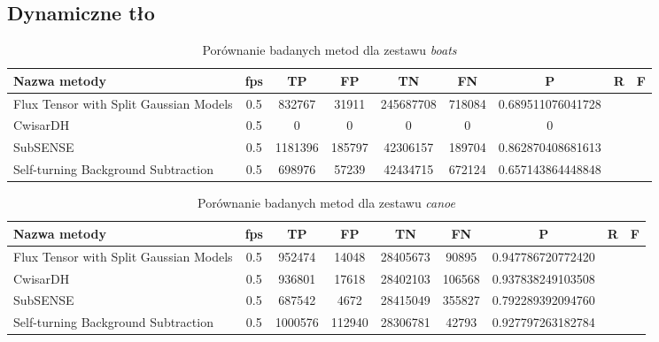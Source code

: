 \subsection{Dynamiczne tło}
\begin{table}[h]
\caption{Porównanie badanych metod dla zestawu \textit{boats}}
\label{tab:resultsBoats}
\centering
\begin{tabular}{|l*{6}{|c}|}
  \hline 
  \textbf{Nazwa metody} & \textbf{fps} & \textbf{TP} & \textbf{FP} & \textbf{TN} & \textbf{FN} & \textbf{P} & \textbf{R} & \textbf{F}\\
  \hline
  Flux Tensor with Split Gaussian Models & 0.5 & 832767 & 31911 & 245687708 & 718084 & 0.689511076041728\\
  \hline
  CwisarDH & 0.5 & 0 & 0 & 0 & 0 & 0 \\
  \hline
  SubSENSE & 0.5 & 1181396 & 185797 & 42306157 & 189704 & 0.862870408681613\\
  \hline
  Self-turning Background Subtraction & 0.5 & 698976 & 57239 & 42434715 & 672124 & 0.657143864448848\\
  \hline
\end{tabular}
\end{table}

\begin{table}[t]
\caption{Porównanie badanych metod dla zestawu \textit{canoe}}
\label{tab:resultsCanoe}
\centering
\begin{tabular}{|l*{6}{|c}|}
  \hline 
  \textbf{Nazwa metody} & \textbf{fps} & \textbf{TP} & \textbf{FP} & \textbf{TN} & \textbf{FN} & \textbf{P} & \textbf{R} & \textbf{F}\\
  \hline
  Flux Tensor with Split Gaussian Models & 0.5 & 952474 & 14048 & 28405673 & 90895 & 0.947786720772420 \\
  \hline
  CwisarDH & 0.5 & 936801 & 17618 & 28402103 & 106568 & 0.937838249103508\\
  \hline
  SubSENSE & 0.5 & 687542 & 4672 & 28415049 & 355827 & 0.792289392094760 \\
  \hline
  Self-turning Background Subtraction & 0.5 & 1000576 & 112940 & 28306781 & 42793 & 0.927797263182784\\
  \hline
\end{tabular}
\end{table}

